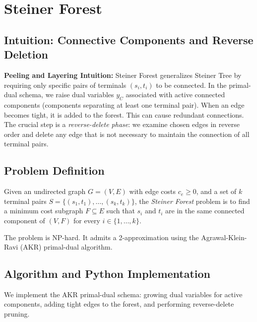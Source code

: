 \documentclass[11pt,oneside]{book}
\begin{document}
\setcounter{chapter}{20}
\chapter{Steiner Forest}
\label{ch:steiner_forest}

\section{Intuition: Connective Components and Reverse Deletion}

\begin{intuitionbox}
\textbf{Peeling and Layering Intuition:} Steiner Forest generalizes Steiner Tree by requiring only specific pairs of terminals $(s_i, t_i)$ to be connected. In the primal-dual schema, we raise dual variables $y_C$ associated with active connected components (components separating at least one terminal pair). When an edge becomes tight, it is added to the forest. This can cause redundant connections. The crucial step is a \emph{reverse-delete phase}: we examine chosen edges in reverse order and delete any edge that is not necessary to maintain the connection of all terminal pairs.
\end{intuitionbox}

\section{Problem Definition}
Given an undirected graph $G = (V, E)$ with edge costs $c_e \ge 0$, and a set of $k$ terminal pairs $S = \{(s_1, t_1), \dots, (s_k, t_k)\}$, the \emph{Steiner Forest} problem is to find a minimum cost subgraph $F \subseteq E$ such that $s_i$ and $t_i$ are in the same connected component of $(V, F)$ for every $i \in \{1, \dots, k\}$.

The problem is NP-hard. It admits a 2-approximation using the Agrawal-Klein-Ravi (AKR) primal-dual algorithm.

\section{Algorithm and Python Implementation}
We implement the AKR primal-dual schema: growing dual variables for active components, adding tight edges to the forest, and performing reverse-delete pruning.
\end{document}
